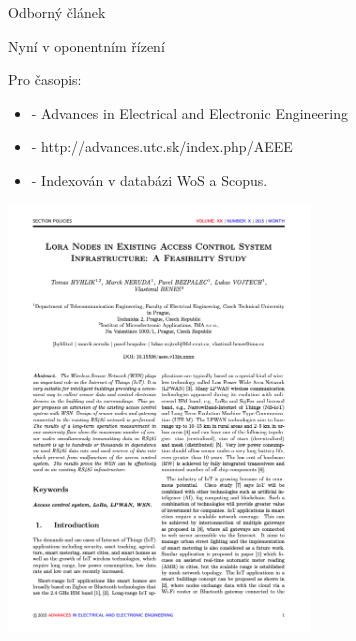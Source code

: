 \documentclass{beamer}
\begin{document}
\begin{frame}{Odborný článek}
	
	Nyní v oponentním řízení

	Pro časopis:
	\begin{itemize}
		\item 	- Advances in Electrical and Electronic Engineering
		\item 	- http://advances.utc.sk/index.php/AEEE
		\item 	- Indexován v databázi WoS a Scopus.
	\end{itemize}


\end{frame}


\begin{frame}
	\centering
\includegraphics[width=0.6\textwidth]{Screenshot_odbornyClanek}
\end{frame}
\end{document}
